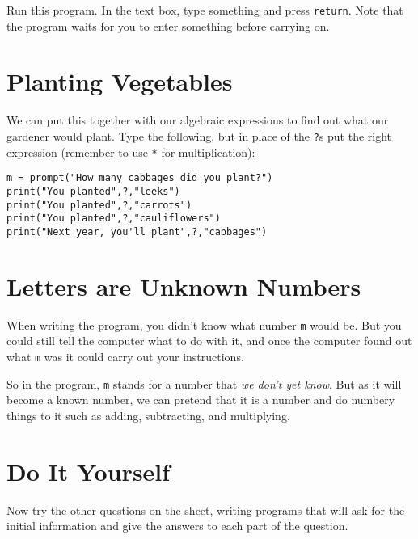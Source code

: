 \documentclass[
  xhtml,%
  text
]{internet}
\begin{document}
Run this program.
In the text box, type something and press \verb+return+.
Note that the program waits for you to enter something before carrying on.

\section*{Planting Vegetables}

We can put this together with our algebraic expressions to find out what our gardener would plant.
Type the following, but in place of the \verb+?+s put the right expression (remember to use \verb+*+ for multiplication):

\begin{verbatim}
m = prompt("How many cabbages did you plant?")
print("You planted",?,"leeks")
print("You planted",?,"carrots")
print("You planted",?,"cauliflowers")
print("Next year, you'll plant",?,"cabbages")
\end{verbatim}

\section*{Letters are Unknown Numbers}

When writing the program, you didn't know what number \verb+m+ would be.
But you could still tell the computer what to do with it, and once the computer found out what \verb+m+ was it could carry out your instructions.

So in the program, \verb+m+ stands for a number that \emph{we don't yet know}.
But as it will become a known number, we can pretend that it is a number and do numbery things to it such as adding, subtracting, and multiplying.

\section*{Do It Yourself}

Now try the other questions on the sheet, writing programs that will ask for the initial information and give the answers to each part of the question.
\end{document}
